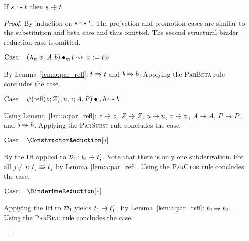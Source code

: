 \begin{lemma}
    If $s \leadsto t$ then $s \Rrightarrow t$
    \label{lem:a:beta_implies_par_step}
\end{lemma}
\begin{proof}
    By induction on $s \leadsto t$.
    The projection and promotion cases are similar to the substitution and beta case and thus omitted.
    The second structural binder reduction case is omitted.

    $\text{Case: }\begin{array}{c} ({\lambda_m}\, x\! : \! A.\, b) \bullet_{m} t \leadsto [x := t]b \end{array}$
    \begin{proofcase}
        By Lemma~\ref{lem:a:par_refl}: $t \Rrightarrow t$ and $b \Rrightarrow b$.
        Applying the \textsc{ParBeta} rule concludes the case.
    \end{proofcase}

    $\text{Case: }\begin{array}{c} \psi(\text{refl}(z; Z), u, v; A, P) \bullet_{\omega} b \leadsto b \end{array}$
    \begin{proofcase}
        Using Lemma~\ref{lem:a:par_refl}: $z \Rrightarrow z$, $Z \Rrightarrow Z$, $u \Rrightarrow u$, $v \Rrightarrow v$, $A \Rrightarrow A$, $P \Rrightarrow P$, and $b \Rrightarrow b$.
        Applying the \textsc{ParSubst} rule concludes the case.
    \end{proofcase}

    $\text{Case: }\begin{array}{c} \ConstructorReduction[*] \end{array}$
    \begin{proofcase}
        By the IH applied to $\mathcal{D}_{1}$: $t_i \Rrightarrow t_i^\prime$.
        Note that there is only one subderivation.
        For all $j \neq i$: $t_j \Rrightarrow t_j$ by Lemma~\ref{lem:a:par_refl}.
        Using the \textsc{ParCtor} rule concludes the case.
    \end{proofcase}

    $\text{Case: }\begin{array}{c} \BinderOneReduction[*] \end{array}$
    \begin{proofcase}
        Applying the IH to $\mathcal{D}_{1}$ yields $t_1 \Rrightarrow t_1^\prime$.
        By Lemma~\ref{lem:a:par_refl}: $t_2 \Rrightarrow t_2$.
        Using the \textsc{ParBind} rule concludes the case.
    \end{proofcase}
\end{proof}

